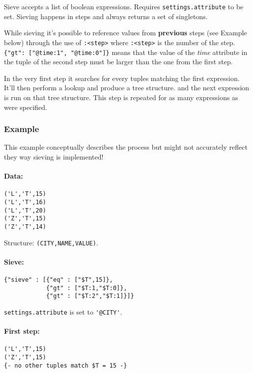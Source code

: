 \documentclass[a4paper]{article}
\begin{document}
Sieve accepts a list of boolean expressions. Requires
\verb|settings.attribute| to be set. Sieving happens in steps and
always returns a set of singletons.

While sieving it's possible to reference values from \textbf{previous}
steps (see Example below) through the use of \verb|:<step>| where
\verb|:<step>| is the number of the step.
\verb|{"gt": ["@time:1", "@time:0"]}| means that the value of the
\textit{time} attribute in the tuple of the second step must be larger
than the one from the first step.

In the very first step it searches for every tuples matching the first
expression. It'll then perform a lookup and produce a tree structure.
and the next expression is run on that tree structure. This step is
repeated for as many expressions as were specified.

\subsubsection{Example}

This example conceptually describes the process but might not
accurately reflect they way sieving is implemented!

\paragraph*{Data:} 

\begin{verbatim}
('L','T',15)
('L','T',16)
('L','T',20)
('Z','T',15)
('Z','T',14)
\end{verbatim}

Structure: \verb|(CITY,NAME,VALUE)|.

\paragraph*{Sieve:}

\begin{verbatim}
{"sieve" : [{"eq" : ["$T",15]},
            {"gt" : ["$T:1,"$T:0]},
            {"gt" : ["$T:2","$T:1]}]}
\end{verbatim}

\verb|settings.attribute| is set to \verb|'@CITY'|.

\paragraph*{First step:}

\begin{verbatim}
('L','T',15)
('Z','T',15)
{- no other tuples match $T = 15 -}
\end{verbatim}
\end{document}

